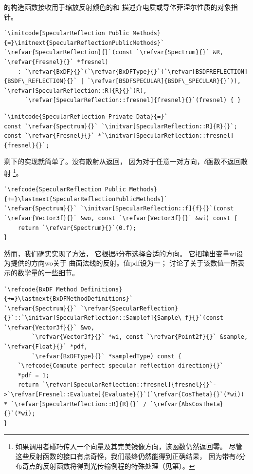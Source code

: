 的构造函数接收用于缩放反射颜色的和
描述介电质或导体菲涅尔性质的对象指针。
\begin{lstlisting}
`\initcode{SpecularReflection Public Methods}{=}\initnext{SpecularReflectionPublicMethods}`
`\refvar{SpecularReflection}{}`(const `\refvar{Spectrum}{}` &R, `\refvar{Fresnel}{}` *fresnel) 
    : `\refvar{BxDF}{}`(`\refvar{BxDFType}{}`(`\refvar[BSDFREFLECTION]{BSDF\_REFLECTION}{}` | `\refvar[BSDFSPECULAR]{BSDF\_SPECULAR}{}`)), `\refvar[SpecularReflection::R]{R}{}`(R),
      `\refvar[SpecularReflection::fresnel]{fresnel}{}`(fresnel) { }
\end{lstlisting}
\begin{lstlisting}
`\initcode{SpecularReflection Private Data}{=}`
const `\refvar{Spectrum}{}` `\initvar[SpecularReflection::R]{R}{}`;
const `\refvar{Fresnel}{}` *`\initvar[SpecularReflection::fresnel]{fresnel}{}`;
\end{lstlisting}

剩下的实现就简单了。没有散射从返回，
因为对于任意一对方向，$\delta$函数不返回散射
\footnote{如果调用者碰巧传入一个向量及其完美镜像方向，该函数仍然返回零。
    尽管这些反射函数的接口有点奇怪，我们最终仍然能得到正确结果，
    因为带有$\delta$分布奇点的反射函数将得到光传输例程的特殊处理（见第）。}。
\begin{lstlisting}
`\refcode{SpecularReflection Public Methods}{+=}\lastnext{SpecularReflectionPublicMethods}`
`\refvar{Spectrum}{}` `\initvar[SpecularReflection::f]{f}{}`(const `\refvar{Vector3f}{}` &wo, const `\refvar{Vector3f}{}` &wi) const { 
    return `\refvar{Spectrum}{}`(0.f); 
}
\end{lstlisting}
然而，我们确实实现了方法，
它根据$\delta$分布选择合适的方向。
它把输出变量{\ttfamily wi}设为提供的方向{\ttfamily wo}关于
曲面法线的反射。值{\ttfamily *pdf}设为一；
讨论了关于该数值一所表示的数学量的一些细节。
\begin{lstlisting}
`\refcode{BxDF Method Definitions}{+=}\lastnext{BxDFMethodDefinitions}`
`\refvar{Spectrum}{}` `\refvar{SpecularReflection}{}`::`\initvar[SpecularReflection::Samplef]{Sample\_f}{}`(const `\refvar{Vector3f}{}` &wo,
        `\refvar{Vector3f}{}` *wi, const `\refvar{Point2f}{}` &sample, `\refvar{Float}{}` *pdf,
        `\refvar{BxDFType}{}` *sampledType) const {
    `\refcode{Compute perfect specular reflection direction}{}`
    *pdf = 1;
    return `\refvar[SpecularReflection::fresnel]{fresnel}{}`->`\refvar[Fresnel::Evaluate]{Evaluate}{}`(`\refvar{CosTheta}{}`(*wi)) * `\refvar[SpecularReflection::R]{R}{}` / `\refvar{AbsCosTheta}{}`(*wi);
}
\end{lstlisting}


